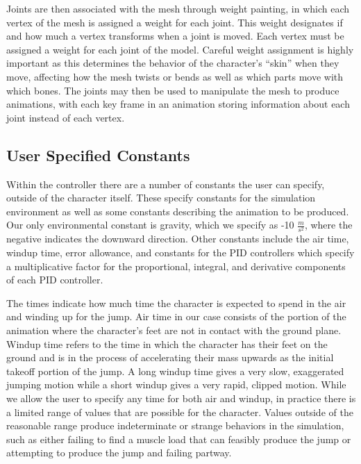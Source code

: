 Joints are then associated with the mesh through weight painting, in which each vertex of the mesh is assigned a weight for each joint.  This weight designates if and how much a vertex transforms when a joint is moved.  Each vertex must be assigned a weight for each joint of the model.  Careful weight assignment is highly important as this determines the behavior of the character's ``skin'' when they move, affecting how the mesh twists or bends as well as which parts move with which bones.  The joints may then be used to manipulate the mesh to produce animations, with each key frame in an animation storing information about each joint instead of each vertex. \cite{gamasutra_char_anim}

\subsection{User Specified Constants}
\label{subsection:user_constants}
Within the controller there are a number of constants the user can specify, outside of the character itself.  These specify constants for the simulation environment as well as some constants describing the animation to be produced.  Our only environmental constant is gravity, which we specify as -10 $\frac{m}{s^2}$, where the negative indicates the downward direction.  Other constants include the air time, windup time, error allowance, and constants for the PID controllers which specify a multiplicative factor for the proportional, integral, and derivative components of each PID controller.

The times indicate how much time the character is expected to spend in the air and winding up for the jump.  Air time in our case consists of the portion of the animation where the character's feet are not in contact with the ground plane.  Windup time refers to the time in which the character has their feet on the ground and is in the process of accelerating their mass upwards as the initial takeoff portion of the jump.  A long windup time gives a very slow, exaggerated jumping motion while a short windup gives a very rapid, clipped motion.  While we allow the user to specify any time for both air and windup, in practice there is a limited range of values that are possible for the character.  Values outside of the reasonable range produce indeterminate or strange behaviors in the simulation, such as either failing to find a muscle load that can feasibly produce the jump or attempting to produce the jump and failing partway.

